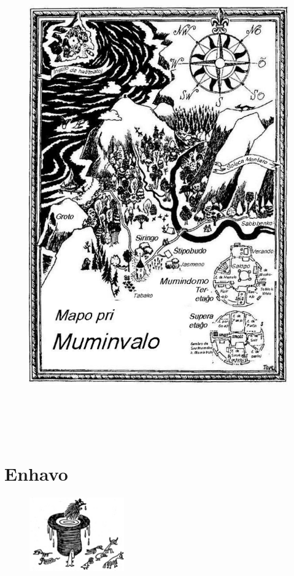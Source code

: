 \thispagestyle{empty}
\setcounter{page}{2}
\vspace*{.5em}

\begin{figure}[htbp]
\centering
\includegraphics[width=401pt,height=585pt]{map-bildo.png}
\caption{}
\label{map-bildo}
\end{figure}

\chapter[Enhavo]{Enhavo}
\hypertarget{Enhavo}{}
\label{Enhavo}


\begin{figure}[htbp]
\centering
\includegraphics[width=117pt,height=90pt]{f000v-01.jpg}
\caption{}
\label{f000v-01}
\end{figure}

